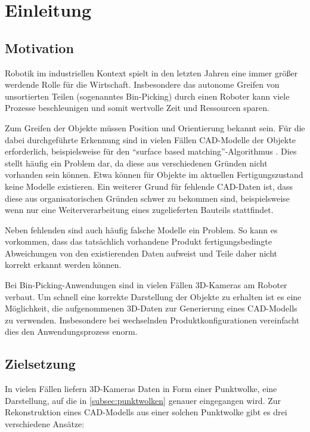
\chapter{Einleitung}
\label{ch:einleitung}


\section{Motivation}
\label{sec:motivation}

Robotik im industriellen Kontext spielt in den letzten Jahren eine immer größer werdende Rolle für die Wirtschaft.
Insbesondere das autonome Greifen von unsortierten Teilen (sogenanntes Bin-Picking) durch einen Roboter kann viele Prozesse beschleunigen und somit wertvolle Zeit und Ressourcen sparen.

Zum Greifen der Objekte müssen Position und Orientierung bekannt sein.
Für die dabei durchgeführte Erkennung sind in vielen Fällen CAD-Modelle der Objekte erforderlich, beispielsweise für den ``surface based matching''-Algorithmus \cite{drost2014recognition}.
Dies stellt häufig ein Problem dar, da diese aus verschiedenen Gründen nicht vorhanden sein können.
Etwa können für Objekte im aktuellen Fertigungszustand keine Modelle existieren.
Ein weiterer Grund für fehlende CAD-Daten ist, dass diese aus organisatorischen Gründen schwer zu bekommen sind, beispielsweise wenn nur eine Weiterverarbeitung eines zugelieferten Bauteils stattfindet.

Neben fehlenden sind auch häufig falsche Modelle ein Problem.
So kann es vorkommen, dass das tatsächlich vorhandene Produkt fertigungsbedingte Abweichungen von den existierenden Daten aufweist und Teile daher nicht korrekt erkannt werden können.

Bei Bin-Picking-Anwendungen sind in vielen Fällen 3D-Kameras am Roboter verbaut.
Um schnell eine korrekte Darstellung der Objekte zu erhalten ist es eine Möglichkeit, die aufgenommenen 3D-Daten zur Generierung eines CAD-Modells zu verwenden.
Insbesondere bei wechselnden Produktkonfigurationen vereinfacht dies den Anwendungsprozess enorm.



\section{Zielsetzung}
\label{sec:zielsetzung}

In vielen Fällen liefern 3D-Kameras Daten in Form einer Punktwolke, eine Darstellung, auf die in \ref{subsec:punktwolken} genauer eingegangen wird.
Zur Rekonstruktion eines CAD-Modells aus einer solchen Punktwolke gibt es drei verschiedene Ansätze:

